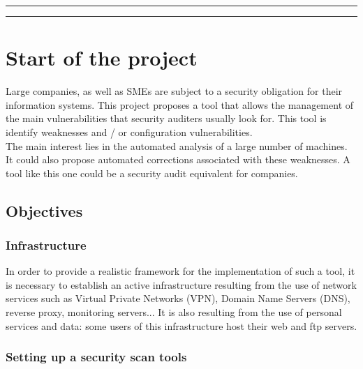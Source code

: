 \pagebreak

\noindent\rule{\textwidth}{.1pt}%
\tableofcontents
\noindent\rule{\textwidth}{.1pt}%

\pagebreak

\section{Start of the project}


Large companies, as well as SMEs are subject to a security obligation
for their information systems. This project proposes a tool that allows the
management of the main vulnerabilities that security auditers usually look for.
This tool is identify weaknesses and / or configuration vulnerabilities.
\\
The main interest lies in the automated analysis of a large number of machines. 
It could also propose automated corrections associated with these weaknesses. 
A tool like this one could be a security audit equivalent for companies.

\vspace{1cm}
\subsection{Objectives}
\vspace{0.5cm}

\subsubsection{Infrastructure}

In order to provide a realistic framework for the implementation of such a tool, it is necessary to establish an active infrastructure resulting from the use of network services such as Virtual Private Networks (VPN), Domain Name Servers (DNS), reverse proxy, monitoring servers... It is also resulting from the use of personal services and data: some users of this infrastructure host their web and ftp servers.

\vspace{0.5cm}
\subsubsection{Setting up a security scan tools}

